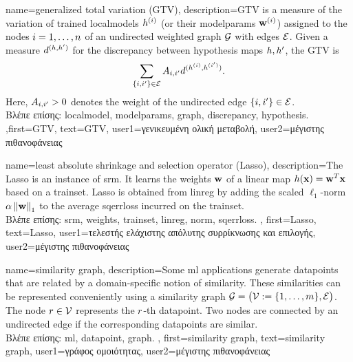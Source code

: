 {name={generalized total variation (GTV)}, 
	description={GTV is a 
		measure of the variation of trained \gls{localmodel}s $h^{(i)}$ 
		(or their \gls{modelparams} $\mathbf{w}^{(i)}$) assigned to the nodes $i=1,\ldots,n$ 
		of an undirected weighted \gls{graph} $\mathcal{G}$ with edges $\mathcal{E}$. Given a measure $d^{(h,h')}$ 
		for the \gls{discrepancy} between \gls{hypothesis} maps $h,h'$, the GTV is 
		\begin{equation} 
			\nonumber
			\sum_{\{i,i'\}\in \mathcal{E}} A_{i,i'} 
			d^{(h^{(i)},h^{(i')})}.
		\end{equation}
		Here, $A_{i,i'}>0$ denotes the weight of the undirected edge $\{i,i'\}\in \mathcal{E}$.\\
		\foreignlanguage{greek}{Βλέπε επίσης:} \gls{localmodel}, \gls{modelparams}, \gls{graph}, \gls{discrepancy}, \gls{hypothesis}.
		},first={GTV},
		text={GTV},
		user1={\foreignlanguage{greek}{γενικευμένη ολική μεταβολή}}, %
  	   	user2={\foreignlanguage{greek}{μέγιστης πιθανοφάνειας}} %
}
	
  {name={least absolute shrinkage and selection operator (Lasso)}, 
	description={The Lasso is an 
		instance of \gls{srm}. It learns the \gls{weights} ${\bf w}$ of a linear map 
		$h({\bf x}) = {\bf w}^{T} {\bf x}$ based on a \gls{trainset}. 
		Lasso is obtained from \gls{linreg} by adding the scaled $\ell_{1}$-\gls{norm} 
		$\alpha \left\Vert {{\bf w}} \right\Vert_{1}$ to the average \gls{sqerrloss} incurred on the \gls{trainset}.\\
		\foreignlanguage{greek}{Βλέπε επίσης:} \gls{srm}, \gls{weights}, \gls{trainset}, \gls{linreg}, \gls{norm}, \gls{sqerrloss}.
	},
	first={Lasso},
	text={Lasso},
	user1={\foreignlanguage{greek}{τελεστής ελάχιστης απόλυτης συρρίκνωσης και επιλογής}}, %
  	user2={\foreignlanguage{greek}{μέγιστης πιθανοφάνειας}} %
}
 
 {name={similarity graph}, 
 	description={Some \gls{ml} applications generate \gls{datapoint}s that 
 		are related by a domain-specific notion of similarity. These similarities can be 
 		represented conveniently using a similarity \gls{graph} $\mathcal{G} = \big(\mathcal{V} := \{1,\ldots,m\},\mathcal{E}\big)$. 
 		The node $r \in \mathcal{V}$ represents the $r$-th \gls{datapoint}. Two 
 		nodes are connected by an undirected edge if the corresponding \gls{datapoint}s are similar.\\
		\foreignlanguage{greek}{Βλέπε επίσης:} \gls{ml}, \gls{datapoint}, \gls{graph}.
 	},
 	first={similarity graph},
	text={similarity graph},
	user1={\foreignlanguage{greek}{γράφος ομοιότητας}}, %
  	user2={\foreignlanguage{greek}{μέγιστης πιθανοφάνειας}} %
}
 
